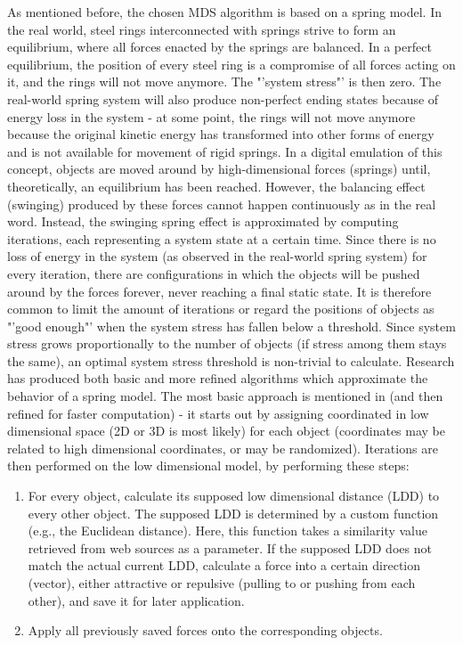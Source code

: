 As mentioned before, the chosen MDS algorithm is based on a spring model. In the real world, steel rings interconnected with springs strive to form an equilibrium, where all forces enacted by the springs are balanced. In a perfect equilibrium, the position of every steel ring is a compromise of all forces acting on it, and the rings will not move anymore. The "'system stress"' is then zero. The real-world spring system will also produce non-perfect ending states because of energy loss in the system - at some point, the rings will not move anymore because the original kinetic energy has transformed into other forms of energy and is not available for movement of rigid springs.
In a digital emulation of this concept, objects are moved around by high-dimensional forces (springs) until, theoretically, an equilibrium has been reached. However, the balancing effect (swinging) produced by these forces cannot happen continuously as in the real word. Instead, the swinging spring effect is approximated by computing iterations, each representing a system state at a certain time. Since there is no loss of energy in the system (as observed in the real-world spring system) for every iteration, there are configurations in which the objects will be pushed around by the forces forever, never reaching a final static state. It is therefore common to limit the amount of iterations or regard the positions of objects as "'good enough"' when the system stress has fallen below a threshold. Since system stress grows proportionally to the number of objects (if stress among them stays the same), an optimal system stress threshold is non-trivial to calculate.
Research has produced both basic and more refined algorithms which approximate the behavior of a spring model. 
The most basic approach is mentioned in \cite{Chalmers:1996:LIT:244979.245035} (and then refined for faster computation) - 
it starts out by assigning coordinated in low dimensional space (2D or 3D is most likely) for each object (coordinates may be related to high dimensional coordinates, or may be randomized). Iterations are then performed on the low dimensional model, by performing these steps:

\begin{enumerate}
	\item For every object, calculate its supposed low dimensional distance (LDD) to every other object. The supposed LDD is determined by a custom function (e.g., the Euclidean distance). Here, this function takes a similarity value retrieved from web sources as a parameter.
	\subitem If the supposed LDD does not match the actual current LDD, calculate a force into a certain direction (vector), either attractive or repulsive (pulling to or pushing from each other), and save it for later application.
	\item Apply all previously saved forces onto the corresponding objects.
\end{enumerate}		

